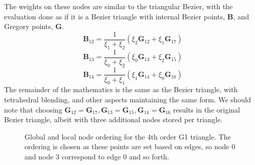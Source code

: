 \documentclass{article}
\begin{document}
The weights on these nodes are similar to the triangular Bezier, with the evaluation done as if it is a Bezier triangle with internal Bezier points, $\mathbf{B}$, and Gregory points, $\mathbf{G}$.
\begin{equation}
\mathbf{B}_{12} = \frac{1}{\xi_1+\xi_2}(\xi_2\mathbf{G}_{12}+\xi_1\mathbf{G}_{17})
\end{equation}
\begin{equation}
\mathbf{B}_{13} = \frac{1}{\xi_0+\xi_2}(\xi_0\mathbf{G}_{13}+\xi_2\mathbf{G}_{15})
\end{equation}
\begin{equation}
\mathbf{B}_{14} = \frac{1}{\xi_0+\xi_1}(\xi_1\mathbf{G}_{14}+\xi_0\mathbf{G}_{16})
\end{equation}
The remainder of the mathematics is the same as the Bezier triangle, with tetrahedral blending, and other aspects maintaining the same form. We should note that choosing $\mathbf{G}_{12} = \mathbf{G}_{17}, \mathbf{G}_{13} = \mathbf{G}_{15}, \mathbf{G}_{14} = \mathbf{G}_{16}$ results in the original Bezier triangle, albeit with three additional nodes stored per triangle.
\begin{figure}
 \hspace{2cm}
\caption{Global and local node ordering for the 4th order G1 triangle. The ordering is chosen as these points are set based on edges, so node 0 and node 3 correspond to edge 0 and so forth.}
\end{figure}
\end{document}
